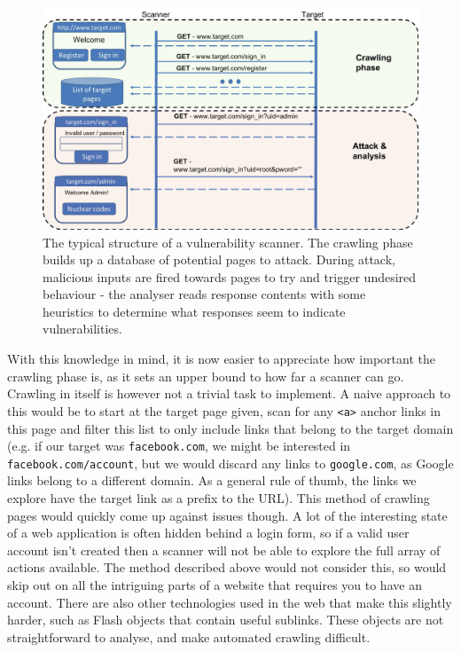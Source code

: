 \begin{figure}[h]
	\centering
	\includegraphics[width=\textwidth]{images/scanner_structure.png}
	\caption{The typical structure of a vulnerability scanner. The crawling phase builds up a database of potential pages to attack. During attack, malicious inputs are fired towards pages to try and trigger undesired behaviour - the analyser reads response contents with some heuristics to determine what responses seem to indicate vulnerabilities.}
	\label{fig:test}
\end{figure}

With this knowledge in mind, it is now easier to appreciate how important the crawling phase is, as it sets an upper bound to how far a scanner can go. Crawling in itself is however not a trivial task to implement. A naive approach to this would be to start at the target page given, scan for any \texttt{<a>} anchor links in this page and filter this list to only include links that belong to the target domain (e.g. if our target was \texttt{facebook.com}, we might be interested in \texttt{facebook.com/account}, but we would discard any links to \texttt{google.com}, as Google links belong to a different domain. As a general rule of thumb, the links we explore have the target link as a prefix to the URL). This method of crawling pages would quickly come up against issues though. A lot of the interesting state of a web application is often hidden behind a login form, so if a valid user account isn't created then a scanner will not be able to explore the full array of actions available. The method described above would not consider this, so would skip out on all the intriguing parts of a website that requires you to have an account. There are also other technologies used in the web that make this slightly harder, such as Flash objects that contain useful sublinks. These objects are not straightforward to analyse, and make automated crawling difficult. \\

